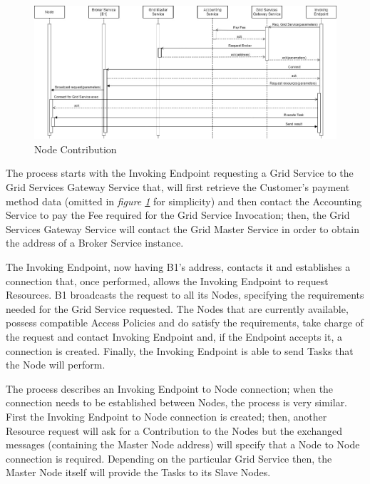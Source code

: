 \begin{itemize}
    \begin{figure}[!ht]
        \centering
        \includegraphics[width=\linewidth]{document/chapters/chapter_6/images/use_cases_satisfaction_node_contribution.jpg}
        \caption{Node Contribution}
        \label{fig:use_cases_satisfaction_node_contribution}
    \end{figure}

    The process starts with the Invoking Endpoint requesting a Grid Service to the Grid Services Gateway Service that, will first retrieve the Customer's payment method data (omitted in \textit{figure \ref{fig:use_cases_satisfaction_node_contribution}} for simplicity) and then contact the Accounting Service to pay the Fee required for the Grid Service Invocation; then, the Grid Services Gateway Service will contact the Grid Master Service in order to obtain the address of a Broker Service instance.

    The Invoking Endpoint, now having B1's address, contacts it and establishes a connection that, once performed, allows the Invoking Endpoint to request Resources. B1 broadcasts the request to all its Nodes, specifying the requirements needed for the Grid Service requested. The Nodes that are currently available, possess compatible Access Policies and do satisfy the requirements, take charge of the request and contact Invoking Endpoint and, if the Endpoint accepts it, a connection is created. Finally, the Invoking Endpoint is able to send Tasks that the Node will perform.

    The process describes an Invoking Endpoint to Node connection; when the connection needs to be established between Nodes, the process is very similar. First the Invoking Endpoint to Node connection is created; then, another Resource request will ask for a Contribution to the Nodes but the exchanged messages (containing the Master Node address) will specify that a Node to Node connection is required. Depending on the particular Grid Service then, the Master Node itself will provide the Tasks to its Slave Nodes.


\end{itemize}
